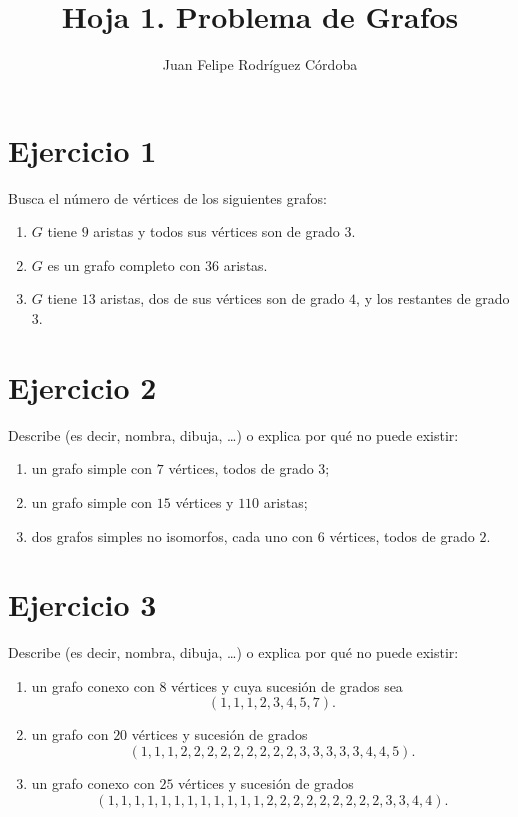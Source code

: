 \documentclass[12pt]{article}
\title{Hoja 1. Problema de Grafos}
\author{Juan Felipe Rodríguez Córdoba}
\date{}
\begin{document}
\maketitle
\section*{Ejercicio 1}

Busca el número de vértices de los siguientes grafos:
\begin{enumerate}
    \item $G$ tiene $9$ aristas y todos sus vértices son de grado $3$.
    \item $G$ es un grafo completo con $36$ aristas.
    \item $G$ tiene $13$ aristas, dos de sus vértices son de grado $4$, y los restantes de grado $3$.
\end{enumerate}

\vspace{15cm}

\section*{Ejercicio 2}
Describe (es decir, nombra, dibuja, \dots) o explica por qué no puede existir:
\begin{enumerate}
    \item un grafo simple con $7$ vértices, todos de grado $3$;
    \item un grafo simple con $15$ vértices y $110$ aristas;
    \item dos grafos simples no isomorfos, cada uno con $6$ vértices, todos de grado $2$.
\end{enumerate}

\vspace{20cm}

\section*{Ejercicio 3}
Describe (es decir, nombra, dibuja, \dots) o explica por qué no puede existir:
\begin{enumerate}
    \item un grafo conexo con $8$ vértices y cuya sucesión de grados sea
    \[
    (1,1,1,2,3,4,5,7).
    \]

    \item un grafo con $20$ vértices y sucesión de grados
    \[
    (1,1,1,2,2,2,2,2,2,2,2,2,3,3,3,3,3,4,4,5).
    \]

    \item un grafo conexo con $25$ vértices y sucesión de grados
    \[
    (1,1,1,1,1,1,1,1,1,1,1,1,2,2,2,2,2,2,2,2,2,3,3,4,4).
    \]
\end{enumerate}
\end{document}
